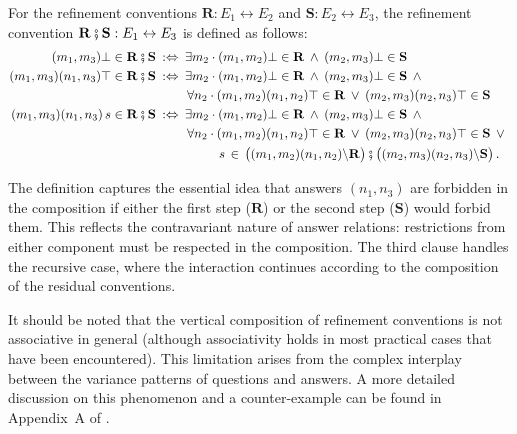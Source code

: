 \begin{definition} \label{def:vcomp}
  For the refinement conventions
  $\mathbf{R} : E_1 \leftrightarrow E_2$ and
  $\mathbf{S} : E_2 \leftrightarrow E_3$,
  the refinement convention
  $\mathbf{R \fatsemi S} : E_1 \leftrightarrow E_3$
  is defined as follows:
  \begin{align*}
    (m_1, m_3) \bot \in \mathbf{R} \fatsemi \mathbf{S} \: :\Leftrightarrow \: {}
    &\exists m_2 \cdot
    (m_1, m_2)\bot \in \mathbf{R} \:\wedge\:
    (m_2, m_3)\bot \in \mathbf{S}
    \\%
    (m_1, m_3) (n_1, n_3) \top \in \mathbf{R} \fatsemi \mathbf{S} \::\Leftrightarrow\: {}
    &\exists m_2 \cdot
    (m_1, m_2)\bot \in \mathbf{R} \:\wedge\:
    (m_2, m_3)\bot \in \mathbf{S} \:\wedge\: {} \\
    &\,\forall n_2 \cdot
    (m_1, m_2)(n_1, n_2)\top \in \mathbf{R} \:\vee\:
    (m_2, m_3)(n_2, n_3)\top \in \mathbf{S}
    \\%
    (m_1, m_3) (n_1, n_3) \, s \in \mathbf{R} \fatsemi \mathbf{S} \::\Leftrightarrow\: {}
    &\exists m_2 \cdot
    (m_1, m_2)\bot \in \mathbf{R} \:\wedge\:
    (m_2, m_3)\bot \in \mathbf{S} \:\wedge\: {} \\
    &\,\forall n_2 \cdot
    (m_1, m_2)(n_1, n_2)\top \in \mathbf{R} \:\vee\:
    (m_2, m_3)(n_2, n_3)\top \in \mathbf{S} \:\vee\: {} \\
    &\qquad \:\:\: s \,\in\,
    \bigl( (m_1, m_2) (n_1, n_2) \backslash \mathbf{R} \bigr) \fatsemi
    \bigl( (m_2, m_3) (n_2, n_3) \backslash \mathbf{S} \bigr)
    \,.
  \end{align*}
\end{definition}

The definition captures the essential idea that
answers $(n_1, n_3)$ are forbidden in the composition
if either the first step ($\mathbf{R}$) or the second step ($\mathbf{S}$) would forbid them.
This reflects the contravariant nature of answer relations:
restrictions from either component must be respected in the composition.
The third clause handles the recursive case,
where the interaction continues according to
the composition of the residual conventions.

\begin{remark} \label{rem:vcomp-assoc}
  It should be noted that the vertical composition
  of refinement conventions
  is not associative in general
  (although associativity holds
  in most practical cases that have been encountered).
  This limitation arises from the complex interplay
  between the variance patterns of questions and answers.
  A more detailed discussion on
  this phenomenon and a counter-example can be found
  in Appendix~A of \citep{compcertoe-tr}.
\end{remark}

